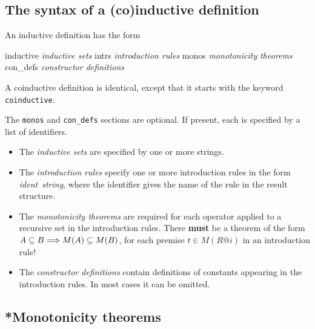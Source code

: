 \subsection{The syntax of a (co)inductive definition}
An inductive definition has the form
\begin{ttbox}
inductive    {\it inductive sets}
  intrs      {\it introduction rules}
  monos      {\it monotonicity theorems}
  con_defs   {\it constructor definitions}
\end{ttbox}
A coinductive definition is identical, except that it starts with the keyword
\texttt{coinductive}.  

The \texttt{monos} and \texttt{con_defs} sections are optional.  If present,
each is specified by a list of identifiers.

\begin{itemize}
\item The \textit{inductive sets} are specified by one or more strings.

\item The \textit{introduction rules} specify one or more introduction rules in
  the form \textit{ident\/}~\textit{string}, where the identifier gives the name of
  the rule in the result structure.

\item The \textit{monotonicity theorems} are required for each operator
  applied to a recursive set in the introduction rules.  There {\bf must}
  be a theorem of the form $A\subseteq B\Longrightarrow M(A)\subseteq M(B)$, for each
  premise $t\in M(R@i)$ in an introduction rule!

\item The \textit{constructor definitions} contain definitions of constants
  appearing in the introduction rules.  In most cases it can be omitted.
\end{itemize}


\subsection{*Monotonicity theorems}

